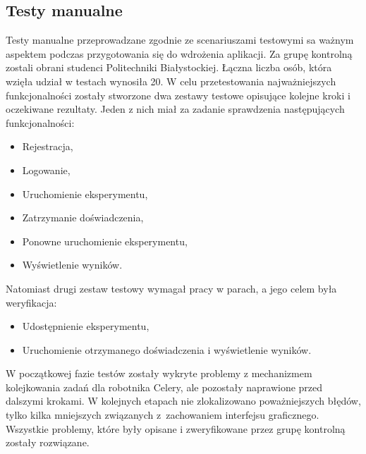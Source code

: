 \subsection{Testy manualne}
Testy manualne przeprowadzane zgodnie ze scenariuszami testowymi sa ważnym aspektem podczas przygotowania się do wdrożenia aplikacji. Za grupę kontrolną zostali obrani studenci Politechniki Białystockiej. Łączna liczba osób, która wzięła udział w testach wynosiła 20. W celu przetestowania najważniejszych funkcjonalności zostały stworzone dwa zestawy testowe opisujące kolejne kroki i oczekiwane rezultaty. Jeden z nich miał za zadanie sprawdzenia następujących funkcjonalności: 
\begin{itemize}
	\item Rejestracja,
	\item Logowanie,
	\item Uruchomienie eksperymentu,
	\item Zatrzymanie doświadczenia,
	\item Ponowne uruchomienie eksperymentu,
	\item Wyświetlenie wyników.
\end{itemize}
Natomiast drugi zestaw testowy wymagał pracy w parach, a jego celem była weryfikacja: 
\begin{itemize}
 	\item Udostępnienie eksperymentu,
 	\item Uruchomienie otrzymanego doświadczenia i wyświetlenie wyników.
\end{itemize}

W początkowej fazie testów zostały wykryte problemy z mechanizmem kolejkowania zadań dla robotnika Celery, ale pozostały naprawione przed dalszymi krokami. W kolejnych etapach nie zlokalizowano poważniejszych błędów, tylko kilka mniejszych związanych z~zachowaniem interfejsu graficznego. Wszystkie problemy, które były opisane i zweryfikowane przez grupę kontrolną zostały rozwiązane.  